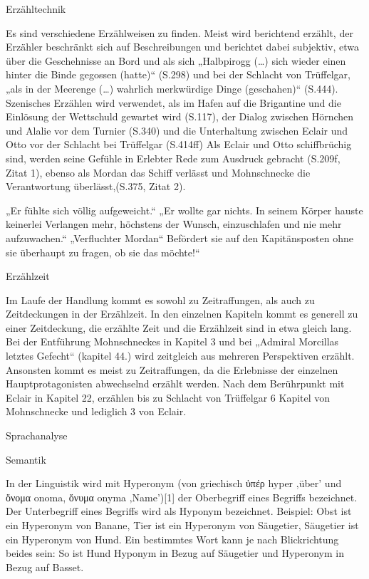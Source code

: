 Erzähltechnik

Es sind verschiedene Erzählweisen zu finden. Meist wird berichtend erzählt, der Erzähler beschränkt sich auf Beschreibungen und berichtet dabei  subjektiv, etwa über die Geschehnisse an Bord und als sich „Halbpirogg (…) sich wieder einen hinter die Binde gegossen (hatte)“ (S.298) und bei der Schlacht von Trüffelgar, „als in der Meerenge (…) wahrlich merkwürdige Dinge (geschahen)“ (S.444). Szenisches Erzählen wird verwendet, als im Hafen auf die Brigantine und die Einlösung der Wettschuld gewartet wird (S.117), der Dialog zwischen Hörnchen und Alalie vor dem Turnier (S.340) und die Unterhaltung zwischen Eclair und Otto vor der Schlacht bei Trüffelgar (S.414ff) Als Eclair und Otto schiffbrüchig sind, werden seine Gefühle in Erlebter Rede zum Ausdruck gebracht (S.209f, Zitat 1), ebenso als Mordan das Schiff verlässt und Mohnschnecke die Verantwortung überlässt,(S.375, Zitat 2).


„Er fühlte sich völlig aufgeweicht.“ „Er wollte gar nichts. In seinem Körper hauste keinerlei Verlangen mehr, höchstens der Wunsch, einzuschlafen und nie mehr aufzuwachen.“
„Verfluchter Mordan“ Befördert sie auf den Kapitänsposten ohne sie überhaupt zu fragen, ob sie das möchte!“

Erzählzeit

Im Laufe der Handlung kommt es sowohl zu Zeitraffungen, als auch zu Zeitdeckungen in der Erzählzeit. In den einzelnen Kapiteln kommt es generell zu einer Zeitdeckung, die erzählte Zeit und die Erzählzeit sind in etwa gleich lang. Bei der Entführung Mohnschneckes in Kapitel 3 und bei „Admiral Morcillas letztes Gefecht“ (kapitel 44.) wird zeitgleich aus mehreren Perspektiven erzählt. Ansonsten kommt es meist zu Zeitraffungen, da die Erlebnisse der einzelnen Hauptprotagonisten abwechselnd erzählt werden.  Nach dem Berührpunkt mit Eclair in Kapitel 22, erzählen bis zu Schlacht von Trüffelgar 6 Kapitel von Mohnschnecke und lediglich 3 von Eclair.

Sprachanalyse
 
Semantik


In der Linguistik wird mit Hyperonym (von griechisch ὑπέρ hyper ‚über’ und ὄνομα onoma, ὄνυμα onyma ‚Name’)[1] der Oberbegriff eines Begriffs bezeichnet. Der Unterbegriff eines Begriffs wird als Hyponym bezeichnet.
Beispiel: Obst ist ein Hyperonym von Banane, Tier ist ein Hyperonym von Säugetier, Säugetier ist ein Hyperonym von Hund.
Ein bestimmtes Wort kann je nach Blickrichtung beides sein: So ist Hund Hyponym in Bezug auf Säugetier und Hyperonym in Bezug auf Basset.


